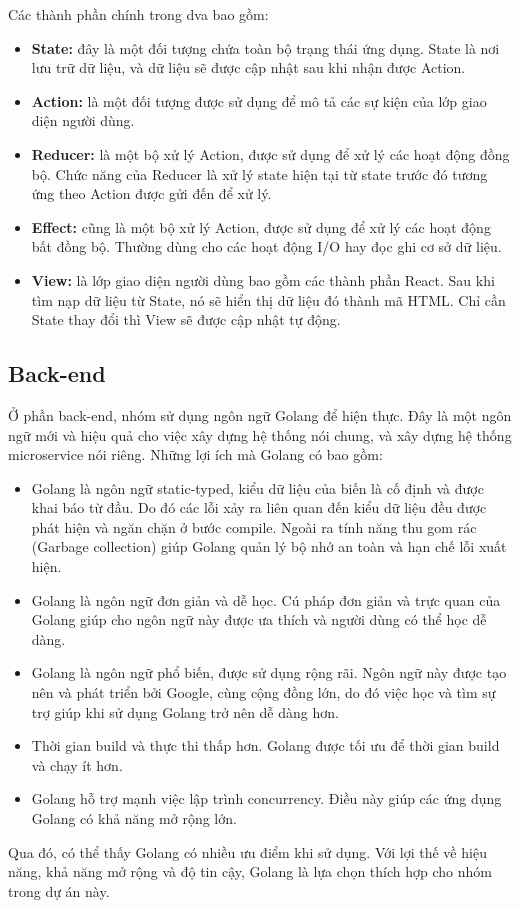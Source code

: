             Các thành phần chính trong dva bao gồm: 
            \begin{itemize}
                \item \textbf{State:} đây là một đối tượng chứa toàn bộ trạng thái ứng dụng. State là nơi lưu trữ dữ liệu, và dữ liệu sẽ được cập nhật sau khi nhận được Action.
                \item \textbf{Action:} là một đối tượng được sử dụng để mô tả các sự kiện của lớp giao diện người dùng.
                \item \textbf{Reducer:} là một bộ xử lý Action, được sử dụng để xử lý các hoạt động đồng bộ. Chức năng của Reducer là xử lý state hiện tại từ state trước đó tương ứng theo Action được gửi đến để xử lý.
                \item \textbf{Effect:} cũng là một bộ xử lý Action, được sử dụng để xử lý các hoạt động bất đồng bộ. Thường dùng cho các hoạt động I/O hay đọc ghi cơ sở dữ liệu.
                \item \textbf{View:} là lớp giao diện người dùng bao gồm các thành phần React. Sau khi tìm nạp dữ liệu từ State, nó sẽ hiển thị dữ liệu đó thành mã HTML. Chỉ cần State thay đổi thì View sẽ được cập nhật tự động.
            \end{itemize}

    
    \subsection{Back-end}
\par Ở phần back-end, nhóm sử dụng ngôn ngữ Golang để hiện thực. Đây là một ngôn ngữ mới và hiệu quả cho việc xây dựng hệ thống nói chung, và xây dựng hệ thống microservice nói riêng.
Những lợi ích mà Golang có bao gồm:
\begin{itemize}
    \item Golang là ngôn ngữ static-typed, kiểu dữ liệu của biến là cố định và được khai báo từ đầu. Do đó các lỗi xảy ra liên quan đến kiểu dữ liệu đều được phát hiện và ngăn chặn ở bước compile. Ngoài ra tính năng thu gom rác (Garbage collection) giúp Golang quản lý bộ nhớ an toàn và hạn chế lỗi xuất hiện.
    \item Golang là ngôn ngữ đơn giản và dễ học. Cú pháp đơn giản và trực quan của Golang giúp cho ngôn ngữ này được ưa thích và người dùng có thể học dễ dàng.
    \item Golang là ngôn ngữ phổ biến, được sử dụng rộng rãi. Ngôn ngữ này được tạo nên và phát triển bởi Google, cùng cộng đồng lớn, do đó việc học và tìm sự trợ giúp khi sử dụng Golang trở nên dễ dàng hơn.
    \item Thời gian build và thực thi thấp hơn. Golang được tối ưu để thời gian build và chạy ít hơn.
    \item Golang hỗ trợ mạnh việc lập trình concurrency. Điều này giúp các ứng dụng Golang có khả năng mở rộng lớn.
\end{itemize}
\par Qua đó, có thể thấy Golang có nhiều ưu điểm khi sử dụng. Với lợi thế về hiệu năng, khả năng mở rộng và độ tin cậy, Golang là lựa chọn thích hợp cho nhóm trong dự án này.